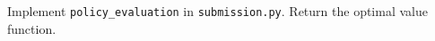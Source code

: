 \item {}

Implement \texttt{policy\_evaluation} in  \texttt{submission.py}. Return the optimal value function.